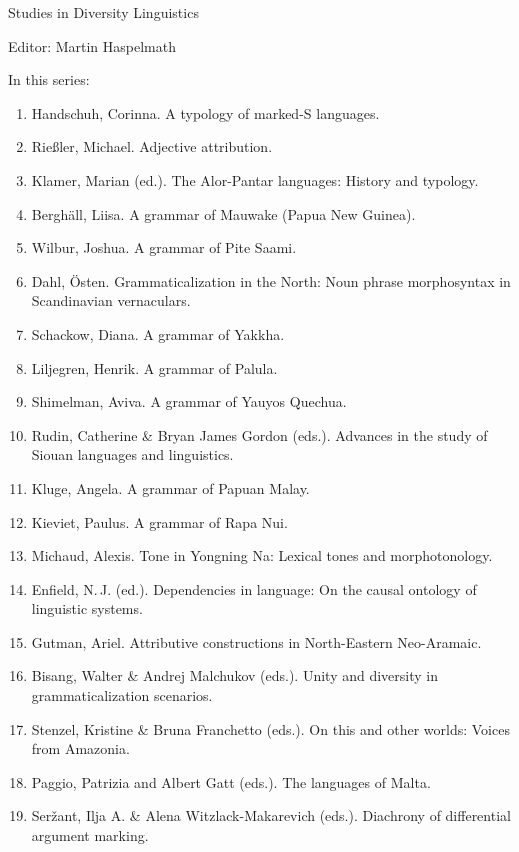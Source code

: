 {\large Studies in Diversity Linguistics}

\bigskip

Editor: Martin Haspelmath  

 
\bigskip 
In this series:


\footnotesize





\begin{enumerate}
\item Handschuh, Corinna. A typology of marked-S languages.
\item Rießler, Michael. Adjective attribution.
\item Klamer, Marian (ed.). The Alor-Pantar languages: History and typology.
\item Berghäll, Liisa. A grammar of Mauwake (Papua New Guinea).
\item Wilbur, Joshua. A grammar of Pite Saami.
\item Dahl, Östen. Grammaticalization in the North: Noun phrase morphosyntax in Scandinavian vernaculars.
\item Schackow, Diana.    A grammar of Yakkha.
\item Liljegren, Henrik. A grammar of Palula.
\item Shimelman, Aviva. A grammar of Yauyos Quechua.
\item Rudin, Catherine \& Bryan James Gordon (eds.). Advances in the study of Siouan languages and linguistics.
\item Kluge, Angela. A grammar of Papuan Malay.
\item Kieviet, Paulus. A grammar of Rapa Nui.
\item Michaud, Alexis. Tone in Yongning Na: Lexical tones and morphotonology.
\item Enfield, N.\,J. (ed.).  Dependencies in language: On the causal ontology of linguistic systems.
\item Gutman, Ariel. Attributive constructions in North-Eastern Neo-Aramaic.
\item Bisang, Walter \& Andrej Malchukov (eds.). Unity and diversity in grammaticalization scenarios.
\item Stenzel, Kristine \& Bruna Franchetto (eds.). On this and other worlds: Voices from Amazonia.
\item Paggio, Patrizia and Albert Gatt (eds.). The languages of Malta.
\item Seržant, Ilja A.  \& Alena Witzlack-Makarevich (eds.). Diachrony of differential argument marking.

\end{enumerate}
